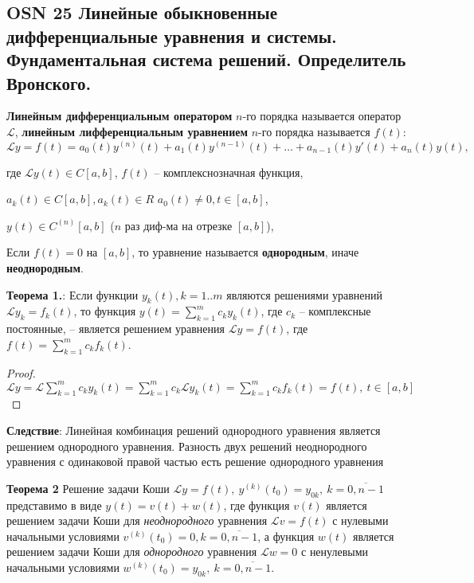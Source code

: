 \subsection{OSN 25 Линейные обыкновенные дифференциальные уравнения и системы. Фундаментальная система решений. Определитель Вронского.}



\textbf{Линейным дифференциальным оператором} $n$-го порядка называется оператор $\mathcal{L}$, \textbf{линейным лифференциальным уравнением}  $n$-го порядка называется $f(t)$:
$$\mathcal{L} y = f(t) = a_0(t)y^{(n)}(t) + a_1(t)y^{(n-1)}(t) +\dots + a_{n-1}(t)y'(t) + a_n(t)y(t),$$

где $\mathcal{L}y(t) \in C[a, b]$, $f(t)$ -- комплекснозначная функция, 

$a_k(t) \in C[a,b], a_k(t) \in R$ $a_0(t) \neq 0, t \in [a,b]$,

$y(t) \in C^{(n)}[a,b]$ ($n$ раз диф-ма на отрезке $[a,b]$), 


Если $f(t) = 0$ на $[a, b]$, то уравнение называется \textbf{однородным}, иначе \textbf{неоднородным}.

\textbf{Теорема 1.}:
Если функции $y_k(t), k=1..m$ являются решениями уравнений $\mathcal{L} y_k = f_k(t)$, то функция $y(t) = \sum_{k=1}^m c_k y_k(t)$, где $c_k$ -- комплексные постоянные, -- является решением уравнения  $\mathcal{L} y = f(t)$, где $f(t) =  \sum_{k=1}^m c_k f_k(t)$.

\begin{proof}
$\mathcal{L} y = \mathcal{L} \sum_{k=1}^m c_k y_k(t) = \sum_{k=1}^m c_k \mathcal{L} y_k(t) = \sum_{k=1}^m c_k f_k(t) = f(t), \ t \in [a,b]$
\end{proof}

\textbf{Следствие}: Линейная комбинация решений однородного уравнения является решением однородного уравнения. Разность двух решений неоднородного уравнения с одинаковой правой частью есть решение однородного уравнения

\textbf{Теорема 2} Решение задачи Коши $\mathcal{L}y = f(t),~y^{(k)}(t_0) = y_{0k},~k = \overline{0, n - 1}$ представимо в виде $y(t) = v(t) + w(t)$, где функция $v(t)$ является решением задачи Коши для \textit{неоднородного} уравнения $\mathcal{L}v = f(t)$ с нулевыми начальными условиями $v^{(k)}(t_0) = 0, k = \overline{0, n - 1}$, а функция $w(t)$ является решением задачи Коши для \textit{однородного} уравнения $\mathcal{L}w = 0$ с ненулевыми начальными условиями $w^{(k)}(t_0) = y_{0k},~k = \overline{0, n - 1}$.


